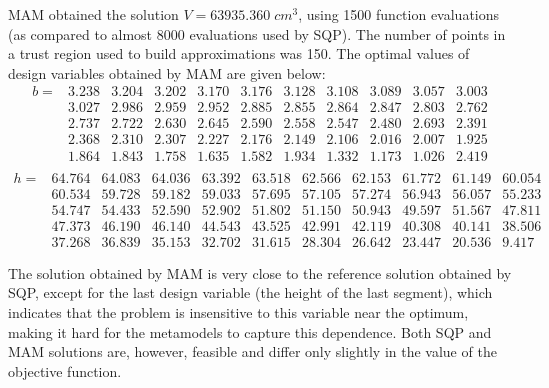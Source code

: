 \documentclass[runningheads,a4paper]{llncs}
\begin{document}
MAM obtained the solution $V = 63935.360\; cm^3$, using 1500 function evaluations (as compared to almost 8000 evaluations used by SQP). The number of points in a trust region used to build approximations was 150. The optimal values of design variables obtained by MAM are given below:
\[
\begin{matrix}
	b=&	3.238&3.204&3.202&3.170&3.176&3.128&3.108&3.089&3.057&3.003 \\  
		& 3.027&2.986&2.959&2.952&2.885&2.855&2.864&2.847&2.803&2.762 \\  
		& 2.737&2.722&2.630&2.645&2.590&2.558&2.547&2.480&2.693&2.391 \\ 
		& 2.368&2.310&2.307&2.227&2.176&2.149&2.106&2.016&2.007&1.925 \\  
		& 1.864&1.843&1.758&1.635&1.582&1.934&1.332&1.173&1.026&2.419 \\ 
\end{matrix}
\]
\[
\begin{matrix}
	h=& 64.764&64.083&64.036&63.392&63.518&62.566&62.153&61.772&61.149& 60.054  \\
		& 60.534&59.728&59.182&59.033&57.695&57.105&57.274&56.943&56.057&55.233  \\
		& 54.747&54.433&52.590&52.902&51.802&51.150&50.943&49.597&51.567&47.811  \\
		& 47.373&46.190&46.140&44.543&43.525&42.991&42.119&40.308&40.141&38.506  \\
		& 37.268&36.839&35.153&32.702&31.615&28.304&26.642&23.447&20.536& 9.417

\end{matrix}
\]

The solution obtained by MAM is very close to the reference solution obtained by SQP, except for the last design variable (the height of the last segment), which indicates that the problem is insensitive to this variable near the optimum, making it hard for the metamodels to capture this dependence. Both SQP and MAM solutions are, however, feasible and differ only slightly in the value of the objective function.
\end{document}
